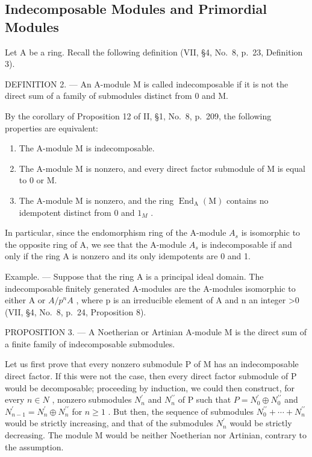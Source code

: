 \subsection{Indecomposable Modules and Primordial Modules}

Let A be a ring. Recall the following definition (VII, §4, No.~8, p.~23, Definition 3).

DEFINITION 2. --- An A-module M is called indecomposable if it is not the direct sum of a family of submodules distinct from 0 and M.

By the corollary of Proposition 12 of II, §1, No.~8, p.~209, the following properties are equivalent:

\begin{enumerate}
\def\labelenumi{\alph{enumi})}
\item
  The A-module M is indecomposable.
\item
  The A-module M is nonzero, and every direct factor submodule of M is equal to 0 or M.
\item
  The A-module M is nonzero, and the ring \(\operatorname{End}_{\mathrm{A}}(\mathrm{M})\) contains no idempotent distinct from 0 and \(1_{M}\) .
\end{enumerate}

In particular, since the endomorphism ring of the A-module \(A_{s}\) is isomorphic to the opposite ring of A, we see that the A-module \(A_{s}\) is indecomposable if and only if the ring A is nonzero and its only idempotents are 0 and 1.

Example. --- Suppose that the ring A is a principal ideal domain. The indecomposable finitely generated A-modules are the A-modules isomorphic to either A or \(A/p^{n}A\) , where p is an irreducible element of A and n an integer \textgreater0 (VII, §4, No.~8, p.~24, Proposition 8).

PROPOSITION 3. --- A Noetherian or Artinian A-module M is the direct sum of a finite family of indecomposable submodules.

Let us first prove that every nonzero submodule P of M has an indecomposable direct factor. If this were not the case, then every direct factor submodule of P would be decomposable; proceeding by induction, we could then construct, for every \(n \in N\) , nonzero submodules \(N_{n}^{\prime}\) and \(N_{n}^{\prime\prime}\) of P such that \(P = N_{0}^{\prime} \oplus N_{0}^{\prime\prime}\) and \(N_{n-1}^{\prime} = N_{n}^{\prime} \oplus N_{n}^{\prime\prime}\) for \(n \geqslant 1\) . But then, the sequence of submodules \(N_{0}^{\prime\prime} + \cdots + N_{n}^{\prime\prime}\) would be strictly increasing, and that of the submodules \(N_{n}^{\prime}\) would be strictly decreasing. The module M would be neither Noetherian nor Artinian, contrary to the assumption.

